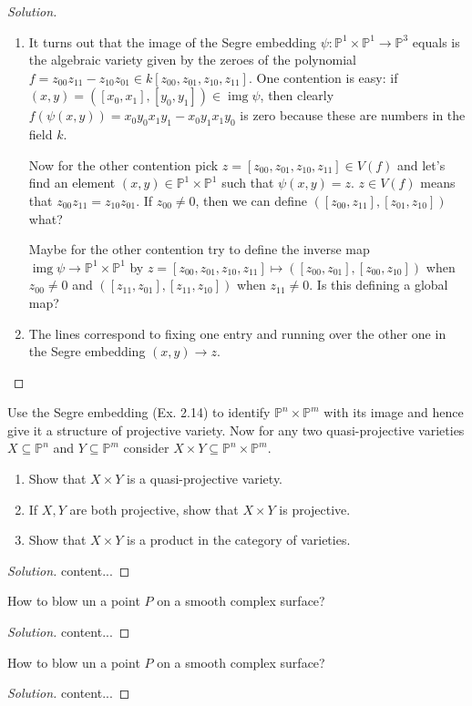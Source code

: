 \documentclass{article}
\renewcommand{\P}{\mathbb{P}}
\DeclareMathOperator{\img}{img}
\begin{document}
\begin{proof}[Solution]\leavevmode
	\begin{enumerate}
		\item It turns out that the image of the Segre embedding $\psi:\P^1\times\P^1\to\P^3$ equals is the algebraic variety given by the zeroes of the polynomial $f=z_{00}z_{11}-z_{10}z_{01}\in k[z_{00},z_{01},z_{10},z_{11}]$. One contention is easy: if $(x,y)=([x_0,x_1],[y_0,y_1])\in\img\psi$, then clearly $f(\psi(x,y))=x_0y_0x_1y_1-x_0y_1x_1y_0$ is zero because these are numbers in the field $k$.
		
		Now for the other contention pick $z=[z_{00},z_{01},z_{10},z_{11}]\in V(f)$ and let's find an element $(x,y)\in\P^1\times\P^1$ such that $\psi(x,y)=z$. $z\in V(f)$ means that $z_{00}z_{11}=z_{10}z_{01}$. If $z_{00}\neq0$, then we can define $([z_{00},z_{11}],[z_{01},z_{10}])$ {\color{magenta}what?}
		
		Maybe for the other contention try to define the inverse map $\img\psi\to\P^1\times\P^1$ by $z=[z_{00},z_{01},z_{10},z_{11}]\mapsto([z_{00},z_{01}],[z_{00},z_{10}])$ when $z_{00}\neq0$ and $([z_{11},z_{01}],[z_{11},z_{10}])$ when $z_{11}\neq0$. Is this defining a global map?
		
		\item The lines correspond to fixing one entry and running over the other one in the Segre embedding $(x,y)\to z$. 
	\end{enumerate}
\end{proof}

\begin{exercise}
	Use the Segre embedding (Ex. 2.14) to identify $\P^n\times\P^m$ with its image and hence give it a structure of projective variety. Now for any two quasi-projective varieties $X\subseteq\P^n$ and $Y\subseteq\P^m$ consider $X\times Y\subseteq\P^n\times\P^m$.
	\begin{enumerate}[label*=(\alph*)]
		\item Show that $X\times Y$ is a quasi-projective variety.
		\item If $X,Y$ are both projective, show that $X\times Y$ is projective.
		\item Show that $X\times Y$ is a product in the category of varieties.
	\end{enumerate}
\end{exercise}
\begin{proof}[Solution]
	content...
\end{proof}
\begin{exercise}[Class]
	How to blow un a point $P$ on a smooth complex surface?
\end{exercise}
\begin{proof}[Solution]
	content...
\end{proof}
\begin{exercise}[Class]
	How to blow un a point $P$ on a smooth complex surface?
\end{exercise}
\begin{proof}[Solution]
	content...
\end{proof}
\end{document}
